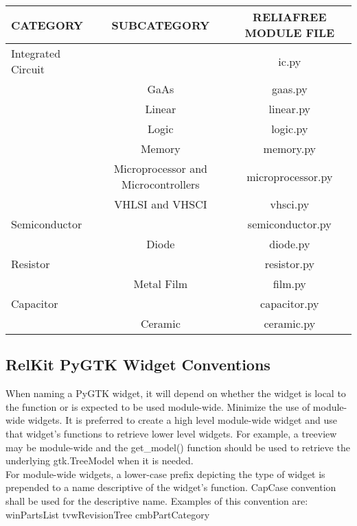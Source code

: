 \documentclass[11pt, 12pt, twoside, onecolumn]{article}
\begin{document}
    \begin{landscape}
    \begin{longtable}{lcc}
    CATEGORY & SUBCATEGORY & RELIAFREE MODULE FILE \\
    \hline
    Integrated Circuit & & ic.py \\
    & GaAs & gaas.py \\
    & Linear & linear.py \\
    & Logic & logic.py \\
    & Memory & memory.py \\
    & Microprocessor and Microcontrollers & microprocessor.py \\
    & VHLSI and VHSCI & vhsci.py \\
    \hline
    Semiconductor & & semiconductor.py \\
    & Diode & diode.py \\
    \hline
    Resistor & & resistor.py \\
    & Metal Film & film.py \\
    \hline
    Capacitor & & capacitor.py \\
    & Ceramic & ceramic.py \\
    \hline
    \end{longtable}
    \end{landscape}

\noindent

\subsection{\bf \large RelKit PyGTK Widget Conventions}

\noindent When naming a PyGTK widget, it will depend on whether the widget is local to the function or is expected to be used module-wide.  Minimize the use of module-wide widgets.  It is preferred to create a high level module-wide widget and use that widget's functions to retrieve lower level widgets.  For example, a treeview may be module-wide and the get\_model() function should be used to retrieve the underlying gtk.TreeModel when it is needed. \\

\noindent For module-wide widgets, a lower-case prefix depicting the type of widget is prepended to a name descriptive of the widget's function.  CapCase convention shall be used for the descriptive name.  Examples of this convention are: \\

    winPartsList
    tvwRevisionTree
    cmbPartCategory
\end{document}
